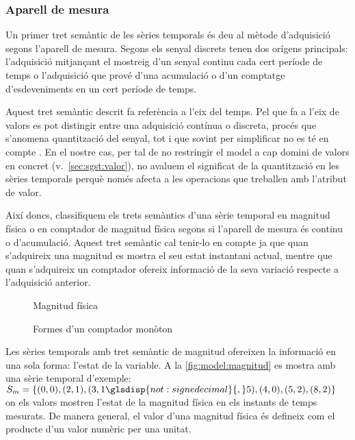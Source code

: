 \subsubsection{Aparell de mesura}


Un primer tret semàntic de les sèries temporals és deu al mètode
d'adquisició segons l'aparell de mesura.  Segons
\textcite[cap.~1]{proakismanolakis96} els senyal discrets tenen dos
orígens principals: l'adquisició mitjançant el mostreig d'un senyal
continu cada cert període de temps o l'adquisició que prové d'una
acumulació o d'un comptatge d'esdeveniments en un cert període de
temps. 


Aquest tret semàntic descrit fa referència a l'eix del
temps. Pel que fa a l'eix de valors es pot distingir entre una
adquisició contínua o discreta, procés que s'anomena quantització del
senyal, tot i que sovint per simplificar no es té en
compte \parencite{proakismanolakis96}.%
En el nostre cas, per tal de no restringir el model a cap domini de
valors en concret (v.~\autoref{sec:sgst:valor}), no avaluem el
significat de la quantització en les sèries temporals perquè només
afecta a les operacions que treballen amb l'atribut de valor.


Així doncs, classifiquem els trets semàntics d'una sèrie temporal en
magnitud física o en comptador de magnitud física segons si l'aparell
de mesura és continu o d'acumulació. Aquest tret semàntic cal
tenir-lo en compte ja que quan s'adquireix una magnitud es mostra el
seu estat instantani actual, mentre que quan s'adquireix un comptador
ofereix informació de la seva variació respecte a l'adquisició
anterior.



\begin{figure}[tp]
  \centering
  
  \caption{Magnitud física}
  \label{fig:model:magnitud}
\end{figure}

\begin{figure}[tp]
  \centering
  
  \caption{Formes d'un comptador monòton}
  \label{fig:model:comptador-formes}
\end{figure}



Les sèries temporals amb tret semàntic de magnitud ofereixen la
informació en una sola forma: l'estat de la variable. A la
\autoref{fig:model:magnitud} es mostra amb una sèrie temporal
d'exemple: $S_m = \{(0,0),(2,1),(3,
1{\glsdisp{not:signedecimal}{,}}5),(4,0),(5,2),(8,2)\}$ on els valors
mostren l'estat de la magnitud física en els instants de temps
mesurats. De manera general, el valor d’una magnitud física és
defineix com el producte d’un valor numèric per una unitat.


